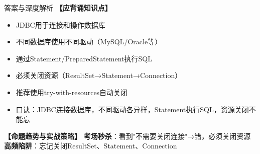 \documentclass[12pt, a4paper]{ctexart}
\begin{document}
\begin{enumerate}[label=\textbf{\arabic*.}]
\begin{bluebox}{答案与深度解析}
		      \textbf{【应背诵知识点】}
		      \begin{itemize}[label={}, nosep]
			      \item JDBC用于连接和操作数据库
			      \item 不同数据库使用不同驱动（MySQL/Oracle等）
			      \item 通过Statement/PreparedStatement执行SQL
			      \item 必须关闭资源（ResultSet→Statement→Connection）
			      \item 推荐使用try-with-resources自动关闭
			      \item 口诀：JDBC连接数据库，不同驱动各异样，Statement执行SQL，资源关闭不能忘
		      \end{itemize}

		      \textbf{【命题趋势与实战策略】}
		      \textbf{考场秒杀}：看到"不需要关闭连接"→错，必须关闭资源
		      \textbf{高频陷阱}：忘记关闭ResultSet、Statement、Connection
	      \end{bluebox}

\end{enumerate}
\end{document}
